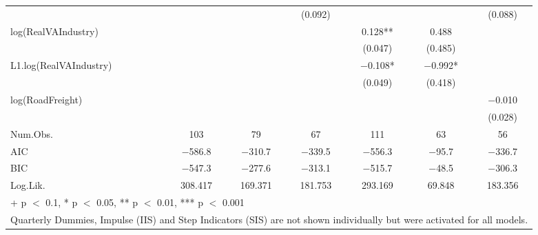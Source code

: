 \begin{table}
{\begin{tabular}[t]{lcccccc}
 &  &  & (\num{0.092}) &  &  & (\num{0.088})\\
log(RealVAIndustry) &  &  &  & \num{0.128}** & \num{0.488} & \\
 &  &  &  & (\num{0.047}) & (\num{0.485}) & \\
L1.log(RealVAIndustry) &  &  &  & \num{-0.108}* & \num{-0.992}* & \\
 &  &  &  & (\num{0.049}) & (\num{0.418}) & \\
log(RoadFreight) &  &  &  &  &  & \num{-0.010}\\
 &  &  &  &  &  & (\num{0.028})\\
\midrule
Num.Obs. & \num{103} & \num{79} & \num{67} & \num{111} & \num{63} & \num{56}\\
AIC & \num{-586.8} & \num{-310.7} & \num{-339.5} & \num{-556.3} & \num{-95.7} & \num{-336.7}\\
BIC & \num{-547.3} & \num{-277.6} & \num{-313.1} & \num{-515.7} & \num{-48.5} & \num{-306.3}\\
Log.Lik. & \num{308.417} & \num{169.371} & \num{181.753} & \num{293.169} & \num{69.848} & \num{183.356}\\
\bottomrule
\multicolumn{7}{l}{\rule{0pt}{1em}+ p $<$ 0.1, * p $<$ 0.05, ** p $<$ 0.01, *** p $<$ 0.001}\\
\multicolumn{7}{l}{\rule{0pt}{1em}Quarterly Dummies, Impulse (IIS) and Step Indicators (SIS) are not shown individually but were activated for all models.}\\
\end{tabular}}
\end{table}

